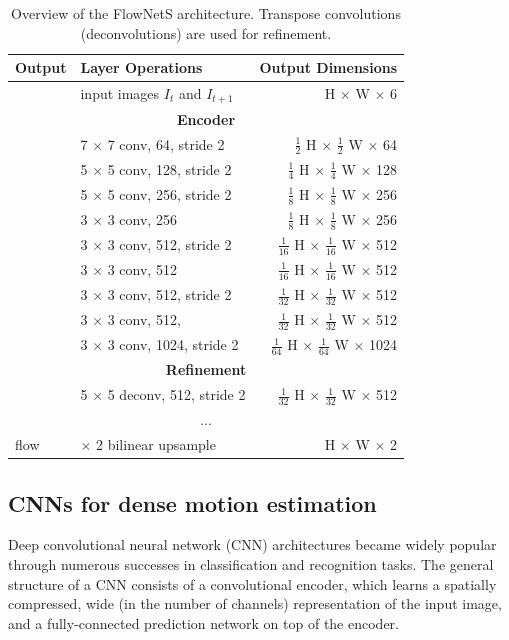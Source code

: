 {
\begin{table}[h]
\centering
\begin{tabular}{llr}
\toprule
\textbf{Output} & \textbf{Layer Operations} & \textbf{Output Dimensions} \\
\midrule\midrule
 & input images $I_t$ and $I_{t+1}$ & H $\times$ W $\times$ 6 \\
\midrule
\multicolumn{3}{c}{\textbf{Encoder}}\\
\midrule
& 7 $\times$ 7 conv, 64, stride 2 & $\tfrac{1}{2}$ H $\times$ $\tfrac{1}{2}$ W $\times$ 64 \\
& 5 $\times$ 5 conv, 128, stride 2 & $\tfrac{1}{4}$ H $\times$ $\tfrac{1}{4}$ W $\times$ 128 \\
& 5 $\times$ 5 conv, 256, stride 2 & $\tfrac{1}{8}$ H $\times$ $\tfrac{1}{8}$ W $\times$ 256 \\
& 3 $\times$ 3 conv, 256 & $\tfrac{1}{8}$ H $\times$ $\tfrac{1}{8}$ W $\times$ 256 \\
& 3 $\times$ 3 conv, 512, stride 2 & $\tfrac{1}{16}$ H $\times$ $\tfrac{1}{16}$ W $\times$ 512 \\
& 3 $\times$ 3 conv, 512 & $\tfrac{1}{16}$ H $\times$ $\tfrac{1}{16}$ W $\times$ 512 \\
& 3 $\times$ 3 conv, 512, stride 2 & $\tfrac{1}{32}$ H $\times$ $\tfrac{1}{32}$ W $\times$ 512 \\
& 3 $\times$ 3 conv, 512, & $\tfrac{1}{32}$ H $\times$ $\tfrac{1}{32}$ W $\times$ 512 \\
& 3 $\times$ 3 conv, 1024, stride 2 & $\tfrac{1}{64}$ H $\times$ $\tfrac{1}{64}$ W $\times$ 1024 \\
\midrule
\multicolumn{3}{c}{\textbf{Refinement}}\\
\midrule
& 5 $\times$ 5 deconv, 512, stride 2 & $\tfrac{1}{32}$ H $\times$ $\tfrac{1}{32}$ W $\times$ 512 \\
\multicolumn{3}{c}{...}\\
\midrule
flow & $\times$ 2 bilinear upsample & H $\times$ W $\times$ 2 \\
\bottomrule
\end{tabular}
\caption {
Overview of the FlowNetS \cite{FlowNet} architecture. Transpose convolutions (deconvolutions)
are used for refinement.
}
\label{table:flownets}
\end{table}
}

\subsection{CNNs for dense motion estimation}
Deep convolutional neural network (CNN) architectures
\cite{ImageNetCNN, VGGNet, ResNet}
became widely popular through numerous successes in classification and recognition tasks.
The general structure of a CNN consists of a convolutional encoder, which
learns a spatially compressed, wide (in the number of channels) representation of the input image,
and a fully-connected prediction network on top of the encoder.

